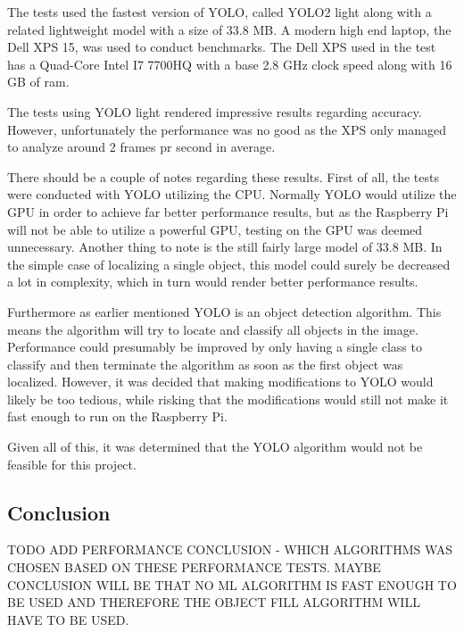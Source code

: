 The tests used the fastest version of YOLO, called YOLO2 light along with a related lightweight model with a size of 33.8 MB. 
A modern high end laptop, the Dell XPS 15, was used to conduct benchmarks.
The Dell XPS used in the test has a Quad-Core Intel I7 7700HQ with a base 2.8 GHz clock speed along with 16 GB of ram.

The tests using YOLO light rendered impressive results regarding accuracy.
However, unfortunately the performance was no good as the XPS only managed to analyze around 2 frames pr second in average.

There should be a couple of notes regarding these results.
First of all, the tests were conducted with YOLO utilizing the CPU.
Normally YOLO would utilize the GPU in order to achieve far better performance results, but as the Raspberry Pi will not be able to utilize a powerful GPU, testing on the GPU was deemed unnecessary. 
Another thing to note is the still fairly large model of 33.8 MB.
In the simple case of localizing a single object, this model could surely be decreased a lot in complexity, which in turn would render better performance results.

Furthermore as earlier mentioned YOLO is an object detection algorithm.
This means the algorithm will try to locate and classify all objects in the image.
Performance could presumably be improved by only having a single class to classify and then terminate the algorithm as soon as the first object was localized.
However, it was decided that making modifications to YOLO would likely be too tedious, while risking that the modifications would still not make it fast enough to run on the Raspberry Pi.

Given all of this, it was determined that the YOLO algorithm would not be feasible for this project.

\subsection{Conclusion}
TODO ADD PERFORMANCE CONCLUSION - WHICH ALGORITHMS WAS CHOSEN BASED ON THESE PERFORMANCE TESTS. MAYBE CONCLUSION WILL BE THAT NO ML ALGORITHM IS FAST ENOUGH TO BE USED AND THEREFORE THE OBJECT FILL ALGORITHM WILL HAVE TO BE USED.